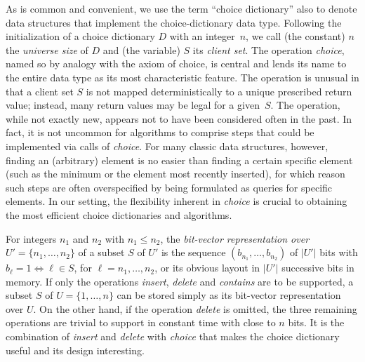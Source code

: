 \documentclass[envcountsame,envcountsect,undated,nolinenumbers]{lnthi}
\def\Tvn#1{\hbox{\textit{#1\/}}}
\begin{document}
As is common and convenient, we use the term
``choice dictionary'' also to denote data structures
that implement the choice-dictionary data type.
Following the initialization of a choice dictionary
$D$ with an integer~$n$,
we call (the constant) $n$ the \emph{universe size}
of $D$ and (the variable) $S$ its
\emph{client set}.
The operation \Tvn{choice}, named so by
analogy with the axiom of choice, is central
and lends its name to the entire data type
as its most characteristic feature.
The operation is unusual in that a client set $S$ is
not mapped deterministically to a unique
prescribed return value;
instead, many return values may be legal for a given~$S$.
The operation, while not exactly new,
appears not to have been considered often in the past.
In fact, it is not uncommon for algorithms to comprise
steps that could be implemented via calls of \Tvn{choice}.
For many classic data structures, however, finding
an (arbitrary) element is no easier than finding
a certain specific element
(such as the minimum or the element most
recently inserted), for which reason such steps are often
overspecified by being formulated as queries for
specific elements.
In our setting, the flexibility inherent in
\Tvn{choice} is crucial to obtaining the most
efficient choice dictionaries and algorithms.

For integers $n_1$ and $n_2$ with $n_1\le n_2$,
the \emph{bit-vector representation over
$U'=\{n_1,\ldots,n_2\}$} of a subset
$S$ of $U'$ is the sequence
$(b_{n_1},\ldots,b_{n_2})$ of $|U'|$ bits with
$b_\ell=1\Leftrightarrow \ell\in S$, for $\ell=n_1,\ldots,n_2$,
or its obvious layout in $|U'|$ successive bits in memory.
If only the operations \Tvn{insert}, \Tvn{delete}
and \Tvn{contains} are to be supported,
a subset $S$ of $U=\{1,\ldots,n\}$ can be
stored simply as its bit-vector representation over $U$.
On the other hand, if
the operation \Tvn{delete} is omitted, the three
remaining operations are trivial to support in constant time
with close to $n$ bits.
It is the combination of \Tvn{insert} and
\Tvn{delete} with \Tvn{choice} that makes
the choice dictionary useful and its design interesting.
\end{document}
